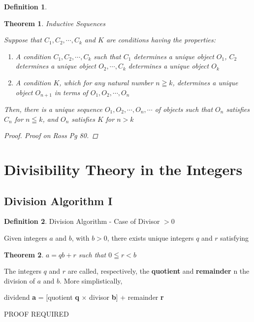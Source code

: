 \documentclass{book}
\newtheorem{theorem}{Theorem}[section]
\theoremstyle{definition}
\newtheorem{definition}{Definition}[section]
\theoremstyle{remark}
\begin{document}
\begin{definition}
\begin{theorem}
Inductive Sequences\\  

    \begin{tcolorbox}
        Suppose that $C_1, C_2, \cdots, C_k$ and $K$ are conditions having the properties:
            \begin{enumerate}
                \item A condition $C_1, C_2, \cdots, C_k$ such that $C_1$ determines a unique object $O_1$, $C_2$ determines a unique object $O_2, \cdots, C_k$ determines a unique object $O_k$
                \item A condition $K$, which for any natural number $n \geqq k$, determines a unique object $O_{n+1}$ in terms of $O_1, O_2, \cdots, O_n$
            \end{enumerate}
        Then, there is a unique sequence $O_1, O_2, \cdots, O_n, \cdots$ of objects such that $O_n$ satisfies $C_n$ for $n \leqq k$, and $O_n$ satisfies $K$ for $n > k$
    \end{tcolorbox}

    \begin{proof}
    Proof on Ross Pg 80.
    \end{proof}
\end{theorem}

\end{definition}






\newpage
\section{Divisibility Theory in the Integers}
\subsection{Division Algorithm I}
\begin{definition}
Division Algorithm - Case of Divisor $> 0$

Given integers $a$ and $b$, with $b>0$, there exists unique integers $q$ and $r$ satisfying 
\begin{tcolorbox}
	\begin{theorem}
		$a = qb + r$ such that $0 \leqq r < b$
	\end{theorem}
\end{tcolorbox}
The integers $q$ and $r$ are called, respectively, the {\bf quotient} and {\bf remainder} n the division of $a$ and $b$. More simplistically, 
	\begin{center}
		dividend {\bf a} = [quotient {\bf q} $\times$ divisor {\bf b}] + remainder {\bf r}	
	\end{center}
PROOF REQUIRED
\end{definition} 
\end{document}
